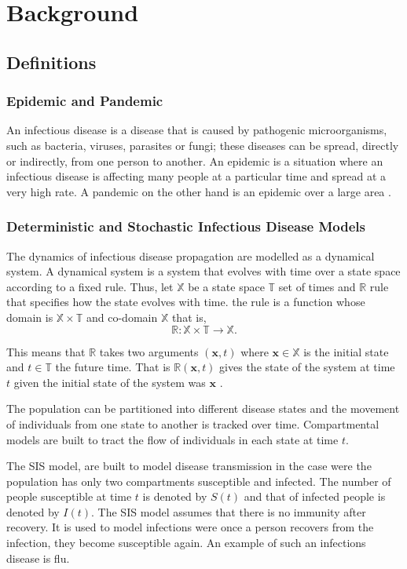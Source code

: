 \chapter{Background}

\section{Definitions}
\subsection{Epidemic and Pandemic }
An infectious disease is a disease that is caused by pathogenic microorganisms, such as bacteria, viruses, parasites or fungi; these diseases can be spread, directly or indirectly, from one person to another. An epidemic is a situation where an infectious disease is affecting many people at a particular time and spread at a very high rate. A pandemic on the other hand
is an epidemic over a large area \citep{morens2009pandemic}.

\subsection{Deterministic and Stochastic Infectious Disease Models}
The dynamics of infectious disease propagation are modelled as a dynamical system. A dynamical system is a system that evolves with time over a state space according to a fixed rule. Thus, let $\mathbb{X}$ be a state space $\mathbb{T}$ set of times and $\mathbb{R}$ rule that specifies how the state evolves with time. the rule is a function  whose domain is $\mathbb{X} \times  \mathbb{T}$ and co-domain $\mathbb{X}$ that is,
\begin{equation*}
\mathbb{R}: \mathbb{X}  \times \mathbb{T} \longrightarrow \mathbb{X}.
\end{equation*}

This means that $\mathbb{R}$ takes two arguments $ (\textbf{x},t)$ where $\textbf{x} \in \mathbb{X}$ is the initial state and $t \in \mathbb{T}$ the future time. That is $\mathbb{R} (\textbf{x},t)$ gives the state of the system at time $t$ given the initial state of the system was $\textbf{x}$ \citep{DQ}.

The population can be partitioned into different disease states and the movement of individuals from one state to another is tracked over time. Compartmental models are built to tract the flow of individuals in each state at time $t$.


The SIS model, are built to model disease transmission in the case were the population has only two compartments susceptible and infected. The number of people susceptible  at time $t$ is denoted by $S(t)$ and that of infected people is denoted by $I(t)$. The SIS model assumes that there is no immunity after recovery. It is used to model infections were once a person recovers from the infection, they become susceptible again. An example of such an infections disease is flu.

